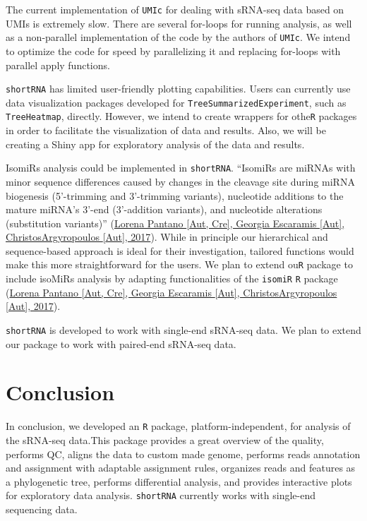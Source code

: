 \documentclass[12pt,twoside]{reedthesis}
\begin{document}
The current implementation of \texttt{UMIc} for dealing with sRNA-seq data
based on UMIs is extremely slow. There are several for-loops for running
analysis, as well as a non-parallel implementation of the code by the
authors of \texttt{UMIc}. We intend to optimize the code for speed by
parallelizing it and replacing for-loops with parallel apply functions.

\texttt{shortRNA} has limited user-friendly plotting capabilities. Users can
currently use data visualization packages developed for
\texttt{TreeSummarizedExperiment}, such as \texttt{TreeHeatmap}, directly. However, we
intend to create wrappers for othe\texttt{R} packages in order to facilitate
the visualization of data and results. Also, we will be creating a Shiny
app for exploratory analysis of the data and results.

IsomiRs analysis could be implemented in \texttt{shortRNA}. ``IsomiRs are miRNAs
with minor sequence differences caused by changes in the cleavage site
during miRNA biogenesis (5'-trimming and 3'-trimming variants),
nucleotide additions to the mature miRNA's 3'-end (3'-addition
variants), and nucleotide alterations (substitution variants)''
(\protect\hyperlink{ref-lorenapantanoautcregeorgiaescaramisautchristosargyropoulosaut2017}{Lorena Pantano {[}Aut, Cre{]}, Georgia Escaramis {[}Aut{]}, ChristosArgyropoulos {[}Aut{]}, 2017}).
While in principle our hierarchical and sequence-based approach is ideal
for their investigation, tailored functions would make this more
straightforward for the users. We plan to extend ou\texttt{R} package to
include isoMiRs analysis by adapting functionalities of the \texttt{isomiR} \texttt{R}
package
(\protect\hyperlink{ref-lorenapantanoautcregeorgiaescaramisautchristosargyropoulosaut2017}{Lorena Pantano {[}Aut, Cre{]}, Georgia Escaramis {[}Aut{]}, ChristosArgyropoulos {[}Aut{]}, 2017}).

\texttt{shortRNA} is developed to work with single-end sRNA-seq data. We plan
to extend our package to work with paired-end sRNA-seq data.

\hypertarget{conclusion}{%
\section{Conclusion}\label{conclusion}}

In conclusion, we developed an \texttt{R} package, platform-independent, for
analysis of the sRNA-seq data.This package provides a great overview of
the quality, performs QC, aligns the data to custom made genome,
performs reads annotation and assignment with adaptable assignment
rules, organizes reads and features as a phylogenetic tree, performs
differential analysis, and provides interactive plots for exploratory
data analysis. \texttt{shortRNA} currently works with single-end sequencing
data.
\end{document}
